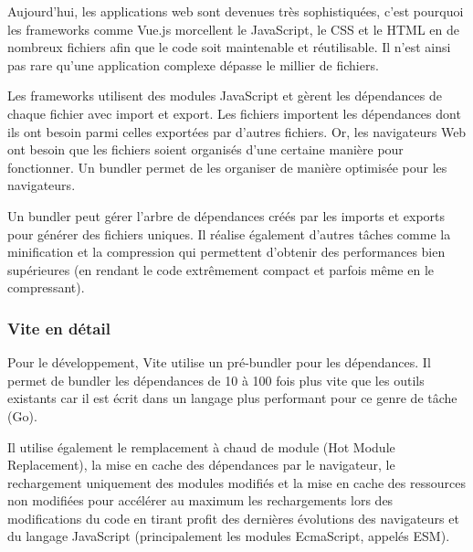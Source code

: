 Aujourd'hui, les applications web sont devenues très sophistiquées, c'est pourquoi les frameworks comme {\color{monOrange}Vue.js} morcellent le {\color{monOrange}JavaScript}, le {\color{monOrange}CSS} et le {\color{monOrange}HTML} en de nombreux fichiers afin que le code soit maintenable et réutilisable. Il n'est ainsi pas rare qu'une application complexe dépasse le millier de fichiers.

Les {\color{monOrange}frameworks} utilisent des modules {\color{monOrange}JavaScript} et gèrent les dépendances de chaque fichier avec import et export. Les fichiers importent les dépendances dont ils ont besoin parmi celles exportées par d'autres fichiers. Or, les navigateurs {\color{monOrange}Web} ont besoin que les fichiers soient organisés d'une certaine manière pour fonctionner. Un {\color{monOrange}bundler} permet de les organiser de manière optimisée pour les navigateurs.

Un {\color{monOrange}bundler} peut gérer l'arbre de dépendances créés par les imports et exports pour générer des fichiers uniques. Il réalise également d'autres tâches comme la minification et la compression qui permettent d'obtenir des performances bien supérieures (en rendant le code extrêmement compact et parfois même en le compressant).

\subsubsection{Vite en détail}
Pour le développement, {\color{monOrange}Vite} utilise un {\color{monOrange}pré-bundler} pour les dépendances. Il permet de {\color{monOrange}bundler} les dépendances de 10 à 100 fois plus vite que les outils existants car il est écrit dans un langage plus performant pour ce genre de tâche ({\color{monOrange}Go}).

Il utilise également le remplacement à chaud de module ({\color{monOrange}Hot Module Replacement}), la mise en cache des dépendances par le navigateur, le rechargement uniquement des modules modifiés et la mise en cache des ressources non modifiées pour accélérer au maximum les rechargements lors des modifications du code en tirant profit des dernières évolutions des navigateurs et du langage {\color{monOrange}JavaScript} (principalement les modules {\color{monOrange}EcmaScript}, appelés {\color{monOrange}ESM}).


